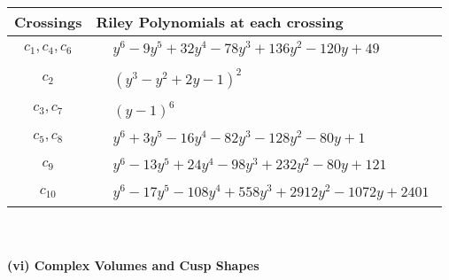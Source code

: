 \documentclass[1p]{elsarticle_modified}
\theoremstyle{definition}
\begin{document}
\begin{tabular}{m{50pt}|m{274pt}}
Crossings & \hspace{64pt}Riley Polynomials at each crossing \\
\hline $$\begin{aligned}c_{1},c_{4},c_{6}\end{aligned}$$&$\begin{aligned}
&y^6-9 y^5+32 y^4-78 y^3+136 y^2-120 y+49
\end{aligned}$\\
\hline $$\begin{aligned}c_{2}\end{aligned}$$&$\begin{aligned}
&(y^3- y^2+2 y-1)^2
\end{aligned}$\\
\hline $$\begin{aligned}c_{3},c_{7}\end{aligned}$$&$\begin{aligned}
&(y-1)^6
\end{aligned}$\\
\hline $$\begin{aligned}c_{5},c_{8}\end{aligned}$$&$\begin{aligned}
&y^6+3 y^5-16 y^4-82 y^3-128 y^2-80 y+1
\end{aligned}$\\
\hline $$\begin{aligned}c_{9}\end{aligned}$$&$\begin{aligned}
&y^6-13 y^5+24 y^4-98 y^3+232 y^2-80 y+121
\end{aligned}$\\
\hline $$\begin{aligned}c_{10}\end{aligned}$$&$\begin{aligned}
&y^6-17 y^5-108 y^4+558 y^3+2912 y^2-1072 y+2401
\end{aligned}$\\
\hline
\end{tabular}\\~\\
\newpage\flushleft \textbf{(vi) Complex Volumes and Cusp Shapes}
\end{document}
